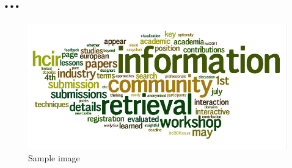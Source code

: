 \section{...}
\lipsum[2]

\begin{figure}[ht!]
\centering
\includegraphics[scale=0.5]{image/wordle.jpg}
\caption{Sample image}
\end{figure}
